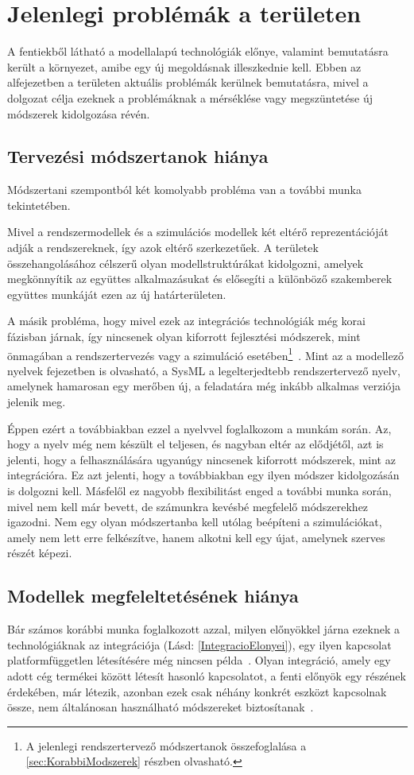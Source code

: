 \section{Jelenlegi problémák a területen}
A fentiekből látható a modellalapú technológiák előnye, valamint bemutatásra került a környezet, amibe egy új megoldásnak illeszkednie kell.
Ebben az alfejezetben a területen aktuális problémák kerülnek bemutatásra, mivel a dolgozat célja ezeknek a problémáknak a mérséklése vagy megszüntetése új módszerek kidolgozása révén.

    \subsection{Tervezési módszertanok hiánya} \label{ModszertanHianya}
    Módszertani szempontból két komolyabb probléma van a további munka tekintetében.
    
    Mivel a rendszermodellek és a szimulációs modellek két eltérő reprezentációját adják a rendszereknek, így azok eltérő szerkezetűek.
    A területek összehangolásához célszerű olyan modellstruktúrákat kidolgozni, amelyek megkönnyítik az együttes alkalmazásukat és elősegíti a különböző szakemberek együttes munkáját ezen az új határterületen.

    A másik probléma, hogy mivel ezek az integrációs technológiák még korai fázisban járnak, így nincsenek olyan kiforrott fejlesztési módszerek, mint önmagában a rendszertervezés vagy a szimuláció esetében\footnote{A jelenlegi rendszertervező módszertanok összefoglalása a \ref{sec:KorabbiModszerek} részben olvasható.}~\cite{Ma_2022}.
    Mint az a modellező nyelvek fejezetben is olvasható, a SysML a legelterjedtebb rendszertervező nyelv, amelynek hamarosan egy merőben új, a feladatára még inkább alkalmas verziója jelenik meg.
    
    Éppen ezért a továbbiakban ezzel a nyelvvel foglalkozom a munkám során.
    Az, hogy a nyelv még nem készült el teljesen, és nagyban eltér az elődjétől, azt is jelenti, hogy a felhasználására ugyanúgy nincsenek kiforrott módszerek, mint az integrációra.
    Ez azt jelenti, hogy a továbbiakban egy ilyen módszer kidolgozásán is dolgozni kell. Másfelől ez nagyobb flexibilitást enged a további munka során, mivel nem kell már bevett, de számunkra kevésbé megfelelő módszerekhez igazodni. Nem egy olyan módszertanba kell utólag beépíteni a szimulációkat, amely nem lett erre felkészítve, hanem alkotni kell egy újat, amelynek szerves részét képezi.

    \subsection{Modellek megfeleltetésének hiánya}
    Bár számos korábbi munka foglalkozott azzal, milyen előnyökkel járna ezeknek a technológiáknak az integrációja (Lásd: \ref{IntegracioElonyei}), egy ilyen kapcsolat platformfüggetlen létesítésére még nincsen példa~\cite{Ma_2022}.
    Olyan integráció, amely egy adott cég termékei között létesít hasonló kapcsolatot, a fenti előnyök egy részének érdekében, már létezik, azonban ezek csak néhány konkrét eszközt kapcsolnak össze, nem általánosan használható módszereket biztosítanak~\cite{SystemComposer}.

